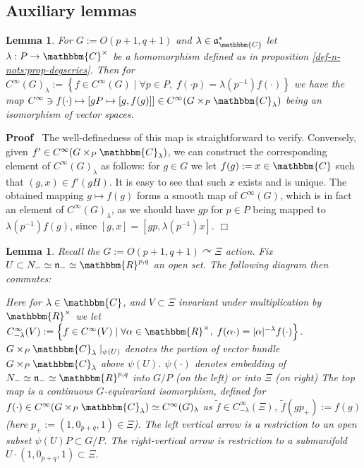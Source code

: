 \documentclass[12pt]{article}
\newcommand{\assign}{:=}
\renewenvironment{proof}{\noindent\textbf{Proof\ }}{\hspace*{\fill}$\Box$\medskip}
\newtheorem{lemma}[proposition]{Lemma}
\theoremstyle{remark}
\begin{document}
\subsection{Auxiliary lemmas}

\begin{lemma}
  \label{sol:lem-unfold}For $G \assign O (p + 1, q + 1)$ and $\lambda \in
  \mathfrak{a}_{\mathbbm{C}}^{\ast}$ let $\lambda : P \rightarrow
  \mathbbm{C}^{\times}$ be a homomorphism defined as in proposition
  \ref{def-n-nots:prop-degseries}. Then for $C^{\infty} (G)_{\lambda} \assign
  \left\{ f \in C^{\infty} (G) \mid \forall p \in P, \; f (\cdot p) =
  \lambda (p^{- 1}) f (\cdot) \right\}$ we have the map $C^{\infty} \ni f
  (\cdot) \mapsto [g P \mapsto [g, f (g)]] \in C^{\infty} (G \times_P
  \mathbbm{C}_{\lambda})$ being an isomorphism of vector spaces.
\end{lemma}

\begin{proof}
  The well-definedness of this map is straightforward to verify. Conversely,
  given $f' \in C^{\infty} (G \times_P \mathbbm{C}_{\lambda})$, we can
  construct the corresponding element of $C^{\infty} (G)_{\lambda}$ as
  follows: for $g \in G$ we let $f (g) \assign x \in \mathbbm{C}$ such that
  $(g, x) \in f' (g H)$. It is easy to see that such $x$ exists and is unique.
  The obtained mapping $g \mapsto f (g)$ forms a smooth map of $C^{\infty}
  (G)$, which is in fact an element of $C^{\infty} (G)_{\lambda}$, as we
  should have $g p$ for $p \in P$ being mapped to $\lambda (p^{- 1}) f (g)$,
  since $[g, x] = [g p, \lambda (p^{- 1}) x]$.
\end{proof}

\begin{lemma}
  \label{sol:lem-commdiag}Recall the $G \assign O (p + 1, q + 1)
  \curvearrowright \Xi$ action. Fix $U \subset N_- \simeq \mathfrak{n}_-
  \simeq \mathbbm{R}^{p, q}$ an open set. The following diagram then commutes:
  
  
  Here for $\lambda \in \mathbbm{C}$, and $V \subset \Xi$ invariant under
  multiplication by $\mathbbm{R}^{\times}$ we let $C^{\infty}_{- \lambda} (V)
  \assign \left\{ f \in C^{\infty} (V) \mid \forall \alpha \in
  \mathbbm{R}^{\times}, \; f (\alpha \cdot) = | \alpha |^{- \lambda} f (\cdot)
  \right\}$. $G \times_P \mathbbm{C}_{\lambda} \mid_{\psi (U)}$ denotes
  the portion of vector bundle $G \times_P \mathbbm{C}_{\lambda}$ above $\psi
  (U)$. $\psi (\cdot)$ denotes embedding of $N_- \simeq \mathfrak{n}_- \simeq
  \mathbbm{R}^{p, q}$ into $G / P$ (on the left) or into $\Xi$ (on right) The
  top map is a continuous $G$-equivariant isomorphism, defined for $f (\cdot)
  \in C^{\infty} (G \times_P \mathbbm{C}_{\lambda}) \simeq C^{\infty}
  (G)_{\lambda}$ as $\tilde{f} \in C^{\infty}_{- \lambda} (\Xi)$, $\tilde{f}
  (g p_+) \assign f (g)$ (here $p_+ \assign (1, 0_{p + q}, 1) \in \Xi$). The
  left vertical arrow is a restriction to an open subset $\psi (U) P \subset G
  / P$. The right-vertical arrow is restriction to a submanifold $U \cdot (1,
  0_{p + q}, 1) \subset \Xi$.
\end{lemma}
\end{document}
